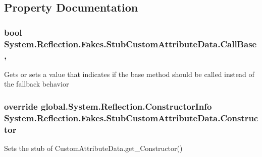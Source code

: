 \subsection{Property Documentation}
\hypertarget{class_system_1_1_reflection_1_1_fakes_1_1_stub_custom_attribute_data_a84a629870a52cfff5e484e0fcab8e341}{
\subsubsection[{Call\-Base}]{\setlength{\rightskip}{0pt plus 5cm}bool System.\-Reflection.\-Fakes.\-Stub\-Custom\-Attribute\-Data.\-Call\-Base\hspace{0.3cm}{\ttfamily [get]}, {\ttfamily [set]}}}\label{class_system_1_1_reflection_1_1_fakes_1_1_stub_custom_attribute_data_a84a629870a52cfff5e484e0fcab8e341}


Gets or sets a value that indicates if the base method should be called instead of the fallback behavior

\hypertarget{class_system_1_1_reflection_1_1_fakes_1_1_stub_custom_attribute_data_a1681ed6a40caec10be6109b5d85ccddd}{
\subsubsection[{Constructor}]{\setlength{\rightskip}{0pt plus 5cm}override global.\-System.\-Reflection.\-Constructor\-Info System.\-Reflection.\-Fakes.\-Stub\-Custom\-Attribute\-Data.\-Constructor\hspace{0.3cm}{\ttfamily [get]}}}\label{class_system_1_1_reflection_1_1_fakes_1_1_stub_custom_attribute_data_a1681ed6a40caec10be6109b5d85ccddd}


Sets the stub of Custom\-Attribute\-Data.\-get\-\_\-\-Constructor()

